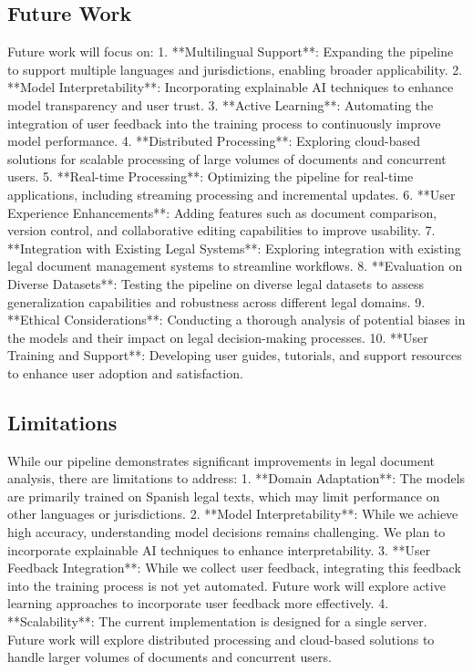 \documentclass[conference]{IEEEtran}
\begin{document}
\subsection{Future Work}
Future work will focus on:
1. **Multilingual Support**: Expanding the pipeline to support multiple languages and jurisdictions, enabling broader applicability.
2. **Model Interpretability**: Incorporating explainable AI techniques to enhance model transparency and user trust.
3. **Active Learning**: Automating the integration of user feedback into the training process to continuously improve model performance.
4. **Distributed Processing**: Exploring cloud-based solutions for scalable processing of large volumes of documents and concurrent users.
5. **Real-time Processing**: Optimizing the pipeline for real-time applications, including streaming processing and incremental updates.
6. **User Experience Enhancements**: Adding features such as document comparison, version control, and collaborative editing capabilities to improve usability.
7. **Integration with Existing Legal Systems**: Exploring integration with existing legal document management systems to streamline workflows.
8. **Evaluation on Diverse Datasets**: Testing the pipeline on diverse legal datasets to assess generalization capabilities and robustness across different legal domains.
9. **Ethical Considerations**: Conducting a thorough analysis of potential biases in the models and their impact on legal decision-making processes.
10. **User Training and Support**: Developing user guides, tutorials, and support resources to enhance user adoption and satisfaction.
\subsection{Limitations}
While our pipeline demonstrates significant improvements in legal document analysis, there are limitations to address:
1. **Domain Adaptation**: The models are primarily trained on Spanish legal texts, which may limit performance on other languages or jurisdictions.
2. **Model Interpretability**: While we achieve high accuracy, understanding model decisions remains challenging. We plan to incorporate explainable AI techniques to enhance interpretability.
3. **User Feedback Integration**: While we collect user feedback, integrating this feedback into the training process is not yet automated. Future work will explore active learning approaches to incorporate user feedback more effectively.
4. **Scalability**: The current implementation is designed for a single server. Future work will explore distributed processing and cloud-based solutions to handle larger volumes of documents and concurrent users.
\end{document}

